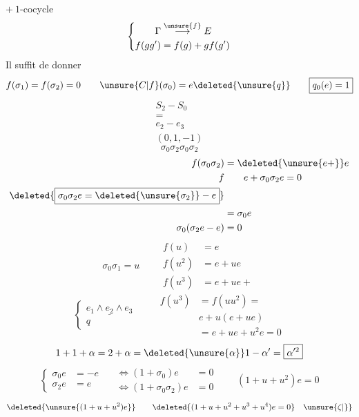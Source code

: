 $+\ 1$-cocycle
\[
\left\{\begin{aligned}
\Gamma&\overset{\unsure{f}}{\longrightarrow} E\\
f(gg')&=f(g)+gf(g')
\end{aligned}\right.
\]
Il suffit de donner
\[
f(\sigma_1)=f(\sigma_2)=0\qquad \unsure{C|f}(\sigma_0)=e\deleted{\unsure{q}}
\qquad\boxed{q_0(e)=1}
\]
\[
\begin{aligned}S_2-S_0\\=\\e_2-e_3\\(0,1,-1)\end{aligned}
\]
\[
\sigma_0\sigma_2\sigma_0\sigma_2
\]
\[
\begin{aligned}f(\sigma_0\sigma_2)&=\deleted{\unsure{e+}}e\\
f&\qquad e+\sigma_0\sigma_2e=0\\
\deleted{\boxed{\sigma_0\sigma_2e=\deleted{\unsure{\sigma_2}}-e}}\\
&=\sigma_0e\\
\sigma_0(\sigma_2e-e)&=0
\end{aligned}
\]
\[
\sigma_0\sigma_1=u\qquad
\begin{aligned}
f(u)&=e\\f(u^2)&=e+ue\\f(u^3)&=e+ue+
\end{aligned}
\]
\[
\left\{\begin{aligned}\underline{e_1\wedge e_2\wedge e_3}\\q\end{aligned}\right.
\qquad
\begin{aligned}
f(u^3)&=f(uu^2)=\\&e+u(e+ue)\\&=e+ue+u^2e=0
\end{aligned}
\]
\[
1+1+\alpha=2+\alpha=\deleted{\unsure{\alpha}}1-\alpha'=\boxed{\alpha'^2}
\]
\[
\boxed{\left\{\begin{aligned}\sigma_0e&=-e\\\sigma_2e&=e\end{aligned}\right.}
\quad\begin{aligned}\Longleftrightarrow(1+\sigma_0)e&=0\\\Longleftrightarrow(1+\sigma_0\sigma_2)e&=0\end{aligned}
\qquad\boxed{(1+u+u^2)e=0}
\]
\[
\deleted{\unsure{(1+u+u^2)e}}\qquad
\deleted{(1+u+u^2+u^3+u^4)e=0}\quad\unsure{\zeta|\}}
\]

